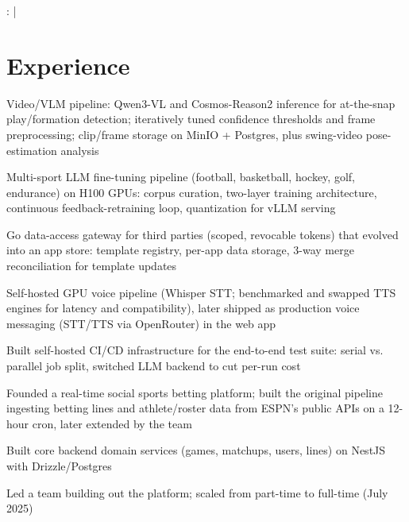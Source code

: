 \documentclass[]{jack-resume}
\begin{document}
\raggedright{
    :
      \href{https://www.linkedin.com/in/jack-sturtevant/}{ \ExternalLink} |
     \href{https://github.com/jacksturt}{ \ExternalLink}}


\section{Experience}

\begin{tightemize}
    \item Video/VLM pipeline: Qwen3-VL and Cosmos-Reason2 inference for at-the-snap play/formation detection; iteratively tuned confidence thresholds and frame preprocessing; clip/frame storage on MinIO + Postgres, plus swing-video pose-estimation analysis
    \item Multi-sport LLM fine-tuning pipeline (football, basketball, hockey, golf, endurance) on H100 GPUs: corpus curation, two-layer training architecture, continuous feedback-retraining loop, quantization for vLLM serving
    \item Go data-access gateway for third parties (scoped, revocable tokens) that evolved into an app store: template registry, per-app data storage, 3-way merge reconciliation for template updates
    \item Self-hosted GPU voice pipeline (Whisper STT; benchmarked and swapped TTS engines for latency and compatibility), later shipped as production voice messaging (STT/TTS via OpenRouter) in the web app
    \item Built self-hosted CI/CD infrastructure for the end-to-end test suite: serial vs. parallel job split, switched LLM backend to cut per-run cost
\end{tightemize}
\sectionsep

\begin{tightemize}
    \item Founded a real-time social sports betting platform; built the original pipeline ingesting betting lines and athlete/roster data from ESPN's public APIs on a 12-hour cron, later extended by the team
    \item Built core backend domain services (games, matchups, users, lines) on NestJS with Drizzle/Postgres
    \item Led a team building out the platform; scaled from part-time to full-time (July 2025)
\end{tightemize}
\sectionsep
\end{document}
